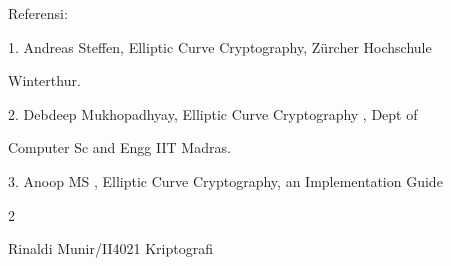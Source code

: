\documentclass{article}
\begin{document}

Referensi:

1. Andreas Steffen, Elliptic Curve Cryptography, Zürcher Hochschule 

Winterthur.

2. Debdeep Mukhopadhyay, Elliptic Curve Cryptography , Dept of 

Computer Sc and Engg IIT Madras.

3. Anoop MS , Elliptic Curve Cryptography,  an Implementation Guide

2

Rinaldi Munir/II4021 Kriptografi
\end{document}
